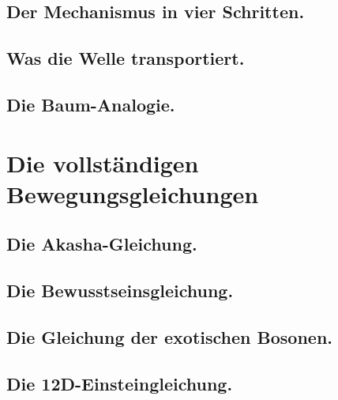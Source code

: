 \subsection{Der Mechanismus in vier Schritten.}
\subsection{Was die Welle transportiert.}
\subsection{Die Baum-Analogie.}

\section{Die vollständigen Bewegungsgleichungen}
\subsection{Die Akasha-Gleichung.}
\subsection{Die Bewusstseinsgleichung.}
\subsection{Die Gleichung der exotischen Bosonen.}
\subsection{Die 12D-Einsteingleichung.}

\newpage
